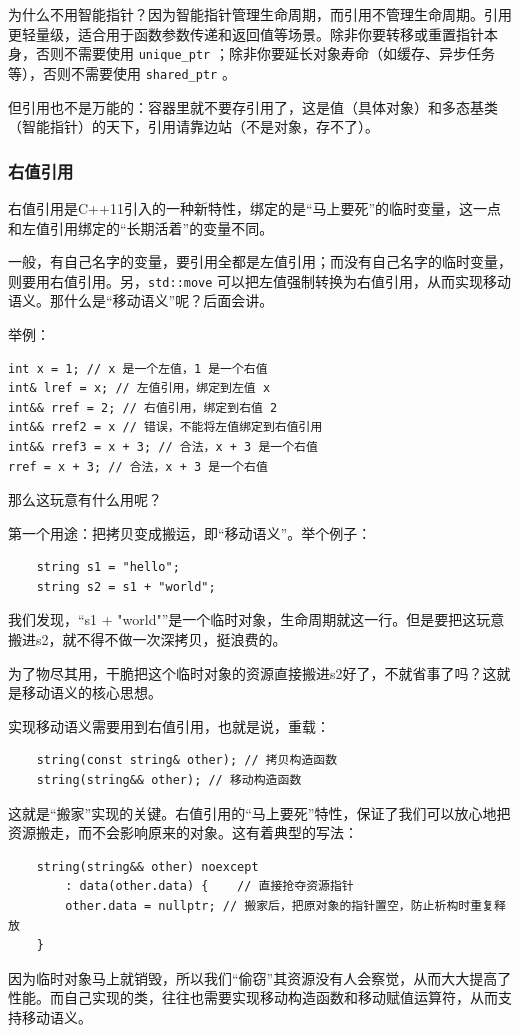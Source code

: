 为什么不用智能指针？因为智能指针管理生命周期，而引用不管理生命周期。引用更轻量级，适合用于函数参数传递和返回值等场景。除非你要转移或重置指针本身，否则不需要使用 \texttt{unique\_ptr} ；除非你要延长对象寿命（如缓存、异步任务等），否则不需要使用 \texttt{shared\_ptr} 。

但引用也不是万能的：容器里就不要存引用了，这是值（具体对象）和多态基类（智能指针）的天下，引用请靠边站（不是对象，存不了）。

\subsubsection{右值引用}

右值引用是C++11引入的一种新特性，绑定的是“马上要死”的临时变量，这一点和左值引用绑定的“长期活着”的变量不同。

一般，有自己名字的变量，要引用全都是左值引用；而没有自己名字的临时变量，则要用右值引用。另，\texttt{std::move} 可以把左值强制转换为右值引用，从而实现移动语义。那什么是“移动语义”呢？后面会讲。

举例：
\begin{verbatim}
int x = 1; // x 是一个左值，1 是一个右值
int& lref = x; // 左值引用，绑定到左值 x
int&& rref = 2; // 右值引用，绑定到右值 2
int&& rref2 = x // 错误，不能将左值绑定到右值引用
int&& rref3 = x + 3; // 合法，x + 3 是一个右值
rref = x + 3; // 合法，x + 3 是一个右值
\end{verbatim}

那么这玩意有什么用呢？

第一个用途：把拷贝变成搬运，即“移动语义”。举个例子：
\begin{verbatim}
    string s1 = "hello";
    string s2 = s1 + "world";
\end{verbatim}
我们发现，“s1 + "world"”是一个临时对象，生命周期就这一行。但是要把这玩意搬进s2，就不得不做一次深拷贝，挺浪费的。

为了物尽其用，干脆把这个临时对象的资源直接搬进s2好了，不就省事了吗？这就是移动语义的核心思想。

实现移动语义需要用到右值引用，也就是说，重载：
\begin{verbatim}
    string(const string& other); // 拷贝构造函数
    string(string&& other); // 移动构造函数
\end{verbatim}
这就是“搬家”实现的关键。右值引用的“马上要死”特性，保证了我们可以放心地把资源搬走，而不会影响原来的对象。这有着典型的写法：
\begin{verbatim}
    string(string&& other) noexcept
        : data(other.data) {    // 直接抢夺资源指针
        other.data = nullptr; // 搬家后，把原对象的指针置空，防止析构时重复释放
    }
\end{verbatim}
因为临时对象马上就销毁，所以我们“偷窃”其资源没有人会察觉，从而大大提高了性能。而自己实现的类，往往也需要实现移动构造函数和移动赋值运算符，从而支持移动语义。

